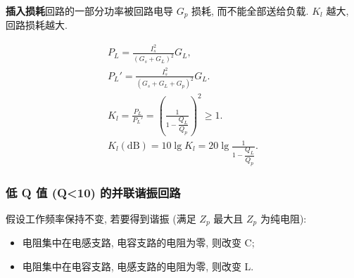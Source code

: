 \textbf{插入损耗}\quad 回路的一部分功率被回路电导 $G_p$ 损耗, 而不能全部送给负载. $K_l$ 越大, 回路损耗越大.

\rmg
\begin{gather}
    P_L=\frac{I_s^2}{(G_s+G_L)^2}G_L, \\
    P_L'=\frac{I_s^2}{(G_s+G_L+G_p)^2}G_L. \\
    K_l=\frac{P_L}{P_L'}=\left(\frac{1}{1-\dfrac{Q_L}{Q_p}}\right)^2\geq 1. \\
    K_l(\mathrm{dB})=10\lg K_l=20\lg\frac{1}{1-\dfrac{Q_L}{Q_p}}.
\end{gather}

\subsubsection{低 Q 值 (Q<10) 的并联谐振回路}

假设工作频率保持不变, 若要得到谐振 (满足 $Z_p$ 最大且 $Z_p$ 为纯电阻):

\begin{itemize}
    \item 电阻集中在电感支路, 电容支路的电阻为零, 则改变 C;
    \item 电阻集中在电容支路, 电感支路的电阻为零, 则改变 L.
\end{itemize}
